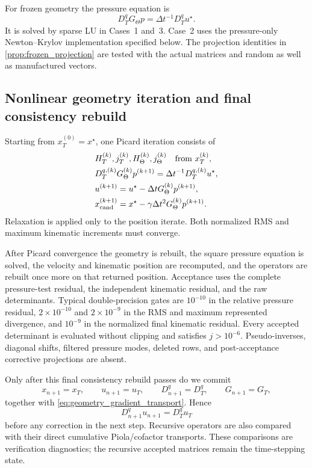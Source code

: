 \documentclass[11pt]{article}
\theoremstyle{plain}
\theoremstyle{definition}
\theoremstyle{remark}
\newcommand{\dt}{\Delta t}
\newcommand{\Th}{\Theta}
\begin{document}
For frozen geometry the pressure equation is
\begin{equation}
  D_T^qG_\Th p=\dt^{-1}D_T^qu^\star.
  \label{eq:discrete_pressure_equation}
\end{equation}
It is solved by sparse LU in Cases~1 and~3.  Case~2 uses the pressure-only
Newton--Krylov implementation specified below.  The projection identities in
\cref{prop:frozen_projection} are tested with the actual matrices and random
as well as manufactured vectors.

\subsection{Nonlinear geometry iteration and final consistency rebuild}

Starting from $x_T^{(0)}=x^\star$, one Picard iteration consists of
\begin{align}
 &H_T^{(k)},j_T^{(k)},H_\Th^{(k)},j_\Th^{(k)}
     \quad\hbox{from }x_T^{(k)},\nonumber\\
 &D_T^{q,(k)}G_\Th^{(k)}p^{(k+1)}
     =\dt^{-1}D_T^{q,(k)}u^\star,\label{eq:picard_linear_solve}\\
 &u^{(k+1)}=u^\star-\dt G_\Th^{(k)}p^{(k+1)},\nonumber\\
 &x_{\rm cand}^{(k+1)}
   =x^\star-\gamma\dt^2G_\Th^{(k)}p^{(k+1)}.
 \label{eq:picard_update_equations}
\end{align}
Relaxation is applied only to the position iterate.  Both normalized RMS and
maximum kinematic increments must converge.

After Picard convergence the geometry is rebuilt, the square pressure equation
is solved, the velocity and kinematic position are recomputed, and the
operators are rebuilt once more on that returned position.  Acceptance uses
the complete pressure-test residual, the independent kinematic residual, and
the raw determinants.  Typical double-precision gates are $10^{-10}$ in the
relative pressure residual, $2\times10^{-10}$ and $2\times10^{-9}$ in the RMS
and maximum represented divergence, and $10^{-9}$ in the normalized final
kinematic residual.  Every accepted determinant is evaluated without clipping
and satisfies $j>10^{-6}$.  Pseudo-inverses, diagonal shifts, filtered pressure
modes, deleted rows, and post-acceptance corrective projections are absent.

Only after this final consistency rebuild passes do we commit
\begin{equation}
 x_{n+1}=x_T,\qquad u_{n+1}=u_T,\qquad
 D_{n+1}^q=D_T^q,\qquad G_{n+1}=G_T,
 \label{eq:full_operator_commit}
\end{equation}
together with \eqref{eq:geometry_gradient_transport}.  Hence
\begin{equation}
 D_{n+1}^qu_{n+1}=D_T^qu_T
 \label{eq:start_step_continuity}
\end{equation}
before any correction in the next step.  Recursive operators are also compared
with their direct cumulative Piola/cofactor transports.  These comparisons are
verification diagnostics; the recursive accepted matrices remain the
time-stepping state.
\end{document}
